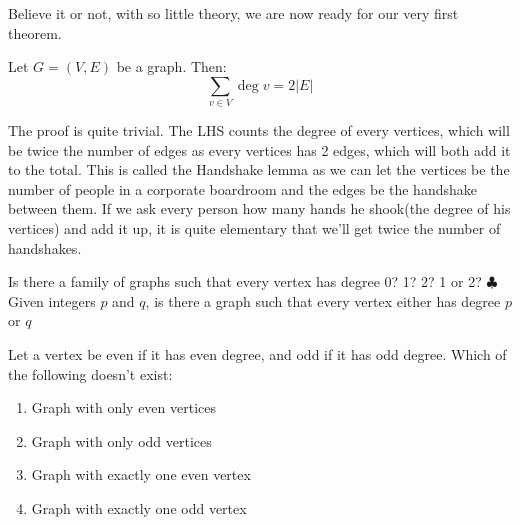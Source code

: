 Believe it or not, with so little theory, we are now ready for our very first theorem. \\
\begin{theorem}
Let $G = (V, E)$ be a graph. Then:
\[ \sum _{v\in V}\deg v=2|E| \]
\end{theorem}
The proof is quite trivial. The LHS counts the degree of every vertices, which will be twice the number of edges as every vertices has 2 edges, which will both add it to the total. This is called the Handshake lemma as we can let the vertices be the number of people in a corporate boardroom and the edges be the handshake between them. If we ask every person how many hands he shook(the degree of his vertices) and add it up, it is quite elementary that we'll get twice the number of handshakes.\\
\begin{example}
     Is there a family of graphs such that every vertex has degree 0? 1? 2? 1 or 2? $\clubsuit$ Given integers $p$ and $q$, is there a graph such that every vertex either has degree $p$ or $q$
\end{example}
\begin{example}
     Let a vertex be even if it has even degree, and odd if it has odd degree. Which of the following doesn't exist: \\
     \begin{enumerate}
         \item Graph with only even vertices
         \item Graph with only odd vertices
         \item Graph with exactly one even vertex
         \item Graph with exactly one odd vertex
     \end{enumerate}
\end{example}
